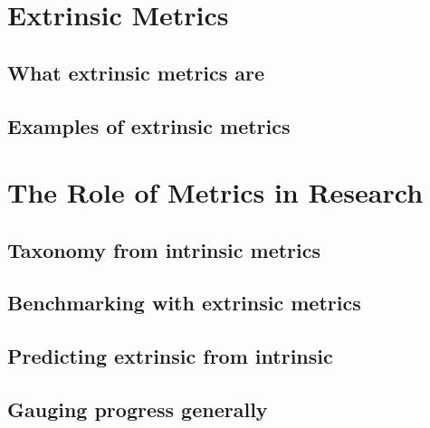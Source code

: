 \documentclass[letterpaper]{report}
\begin{document}
\chapter{Extrinsic Metrics}
\section{What extrinsic metrics are}
\section{Examples of extrinsic metrics}

\chapter{The Role of Metrics in Research}
\section{Taxonomy from intrinsic metrics}
\section{Benchmarking with extrinsic metrics}
\section{Predicting extrinsic from intrinsic}
\section{Gauging progress generally}



\end{document}
